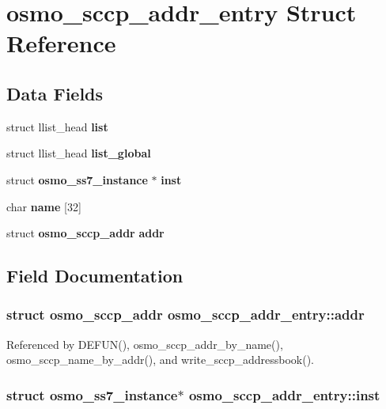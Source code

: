 \section{osmo\+\_\+sccp\+\_\+addr\+\_\+entry Struct Reference}
\label{structosmo__sccp__addr__entry}
\subsection*{Data Fields}
\begin{DoxyCompactItemize}
\item 
struct llist\+\_\+head {\bf list}
\item 
struct llist\+\_\+head {\bf list\+\_\+global}
\item 
struct {\bf osmo\+\_\+ss7\+\_\+instance} $\ast$ {\bf inst}
\item 
char {\bf name} [32]
\item 
struct {\bf osmo\+\_\+sccp\+\_\+addr} {\bf addr}
\end{DoxyCompactItemize}


\subsection{Field Documentation}
\subsubsection[{addr}]{\setlength{\rightskip}{0pt plus 5cm}struct {\bf osmo\+\_\+sccp\+\_\+addr} osmo\+\_\+sccp\+\_\+addr\+\_\+entry\+::addr}\label{structosmo__sccp__addr__entry_aa2a11e5fb586cae8c2c292a62b46f756}


Referenced by D\+E\+F\+U\+N(), osmo\+\_\+sccp\+\_\+addr\+\_\+by\+\_\+name(), osmo\+\_\+sccp\+\_\+name\+\_\+by\+\_\+addr(), and write\+\_\+sccp\+\_\+addressbook().

\subsubsection[{inst}]{\setlength{\rightskip}{0pt plus 5cm}struct {\bf osmo\+\_\+ss7\+\_\+instance}$\ast$ osmo\+\_\+sccp\+\_\+addr\+\_\+entry\+::inst}\label{structosmo__sccp__addr__entry_a11eb820b2bbe24eba88b11d923f4a973}


